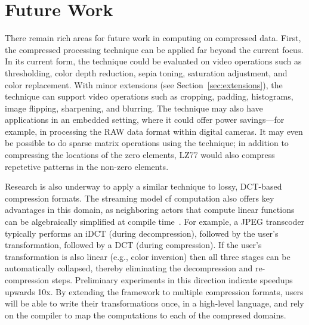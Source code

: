\section{Future Work}
\label{sec:future}


There remain rich areas for future work in computing on compressed
data.  First, the compressed processing technique can be applied far
beyond the current focus.  In its current form, the technique could be
evaluated on video operations such as thresholding, color depth
reduction, sepia toning, saturation adjustment, and color replacement.
With minor extensions (see Section~\ref{sec:extensions}), the
technique can support video operations such as cropping, padding,
histograms, image flipping, sharpening, and blurring.  The technique
may also have applications in an embedded setting, where it could
offer power savings---for example, in processing the RAW data format
within digital cameras.  It may even be possible to do sparse matrix
operations using the technique; in addition to compressing the
locations of the zero elements, LZ77 would also compress repetetive
patterns in the non-zero elements.

Research is also underway to apply a similar technique to lossy,
DCT-based compression formats.  The streaming model cf computation
also offers key advantages in this domain, as neighboring actors that
compute linear functions can be algebraically simplified at compile
time~\cite{aalamb}.  For example, a JPEG transcoder typically performs
an iDCT (during decompression), followed by the user's transformation,
followed by a DCT (during compression).  If the user's transformation
is also linear (e.g., color inversion) then all three stages can be
automatically collapsed, thereby eliminating the decompression and
re-compression steps.  Preliminary experiments in this direction
indicate speedups upwards 10x.  By extending the framework to multiple
compression formats, users will be able to write their transformations
once, in a high-level language, and rely on the compiler to map the
computations to each of the compresed domains.

